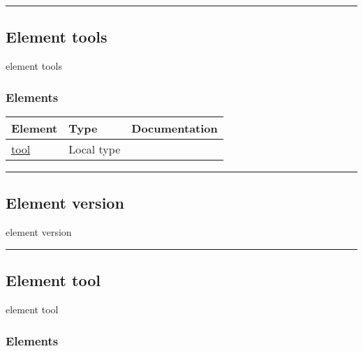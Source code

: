 \documentclass[
]{article}
\begin{document}
\begin{center}\rule{0.5\linewidth}{0.5pt}\end{center}

\protect\hypertarget{element_tools}{}{}

\hypertarget{element-tools}{%
\subsection{\texorpdfstring{Element { tools
}}{Element  tools }}\label{element-tools}}

{element tools}

\hypertarget{elements-2}{%
\subsubsection{Elements}\label{elements-2}}

\begin{longtable}[]{@{}lll@{}}
\toprule
Element & Type & Documentation \\
\midrule
\endhead
\protect\hyperlink{element_tool}{tool} & Local type & \\
\bottomrule
\end{longtable}

\begin{center}\rule{0.5\linewidth}{0.5pt}\end{center}

\protect\hypertarget{element_version}{}{}

\hypertarget{element-version}{%
\subsection{\texorpdfstring{Element { version
}}{Element  version }}\label{element-version}}

{element version}

\begin{center}\rule{0.5\linewidth}{0.5pt}\end{center}

\protect\hypertarget{element_tool}{}{}

\hypertarget{element-tool}{%
\subsection{\texorpdfstring{Element { tool
}}{Element  tool }}\label{element-tool}}

{element tool}

\hypertarget{elements-3}{%
\subsubsection{Elements}\label{elements-3}}
\end{document}
